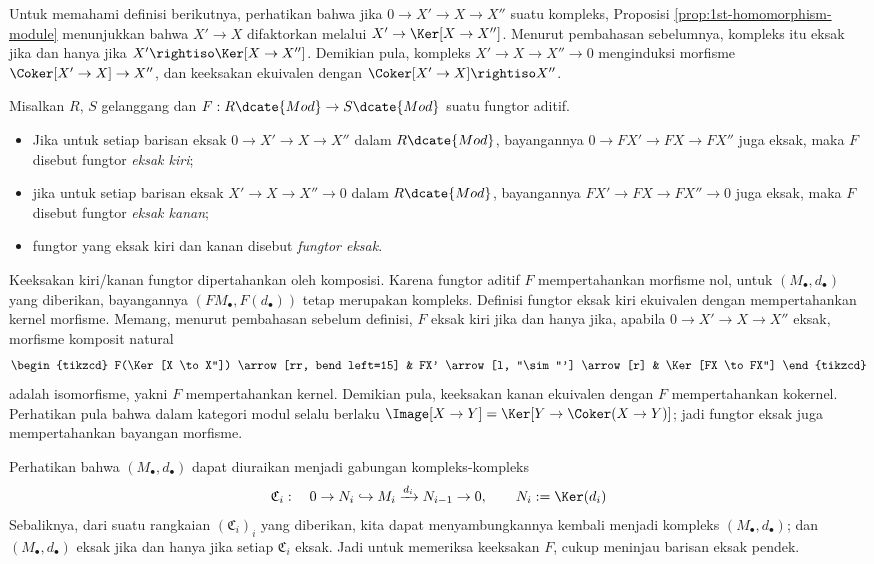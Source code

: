 Untuk memahami definisi berikutnya, perhatikan bahwa jika $0 \to X' \to X \to X''$ suatu kompleks, Proposisi \ref{prop:1st-homomorphism-module} menunjukkan bahwa $X' \to X$ difaktorkan melalui $X' \to \Ker[X \to X'']$. Menurut pembahasan sebelumnya, kompleks itu eksak jika dan hanya jika $X' \rightiso \Ker[X \to X'']$. Demikian pula, kompleks $X' \to X \to X'' \to 0$ menginduksi morfisme $\Coker[X' \to X] \to X''$, dan keeksakan ekuivalen dengan $\Coker[X' \to X] \rightiso X''$.

\begin{definition}
	Misalkan $R$, $S$ gelanggang dan $F: R\dcate{Mod} \to S\dcate{Mod}$ suatu fungtor aditif.
	\begin{itemize}
		\item Jika untuk setiap barisan eksak $0 \to X' \to X \to X''$ dalam $R\dcate{Mod}$, bayangannya $0 \to FX' \to FX \to FX''$ juga eksak, maka $F$ disebut fungtor \emph{eksak kiri};
		\item jika untuk setiap barisan eksak $X' \to X \to X'' \to 0$ dalam $R\dcate{Mod}$, bayangannya $FX' \to FX \to FX'' \to 0$ juga eksak, maka $F$ disebut fungtor \emph{eksak kanan};
		\item fungtor yang eksak kiri dan kanan disebut \emph{fungtor eksak}.
	\end{itemize}
\end{definition}

Keeksakan kiri/kanan fungtor dipertahankan oleh komposisi. Karena fungtor aditif $F$ mempertahankan morfisme nol, untuk $(M_\bullet, d_\bullet)$ yang diberikan, bayangannya $(FM_\bullet, F(d_\bullet))$ tetap merupakan kompleks. Definisi fungtor eksak kiri ekuivalen dengan mempertahankan kernel morfisme. Memang, menurut pembahasan sebelum definisi, $F$ eksak kiri jika dan hanya jika, apabila $0 \to X' \to X \to X''$ eksak, morfisme komposit natural
\[\begin{tikzcd}
	F(\Ker[X \to X'']) \arrow[rr, bend left=15] & FX' \arrow[l, "\sim"'] \arrow[r] & \Ker[FX \to FX'']
\end{tikzcd}\]
adalah isomorfisme, yakni $F$ mempertahankan kernel. Demikian pula, keeksakan kanan ekuivalen dengan $F$ mempertahankan kokernel. Perhatikan pula bahwa dalam kategori modul selalu berlaku $\Image[X \to Y] = \Ker[Y \to \Coker(X \to Y)]$; jadi fungtor eksak juga mempertahankan bayangan morfisme.

Perhatikan bahwa $(M_\bullet, d_\bullet)$ dapat diuraikan menjadi gabungan kompleks-kompleks
\begin{gather*}
	\mathfrak{C}_i: \quad 0 \to N_i \hookrightarrow M_i \xrightarrow{d_i} N_{i-1} \to 0, \qquad N_i := \Ker(d_i)
\end{gather*}
Sebaliknya, dari suatu rangkaian $(\mathfrak{C}_i)_i$ yang diberikan, kita dapat menyambungkannya kembali menjadi kompleks $(M_\bullet, d_\bullet)$; dan $(M_\bullet, d_\bullet)$ eksak jika dan hanya jika setiap $\mathfrak{C}_i$ eksak. Jadi untuk memeriksa keeksakan $F$, cukup meninjau barisan eksak pendek.

